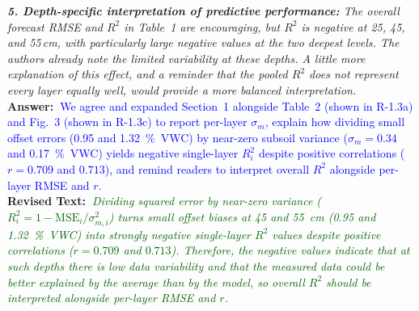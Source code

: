 \documentclass[10pt]{article}
\newcommand{\query}[2][]{\ifthenelse{\equal{#1}{}}{}{\textbf{#1:}~}\emph{#2}}
\newcommand{\ans}[1]{\textbf{Answer:~}#1}
\newcommand{\Rtext}[1]{\textbf{Revised Text:~}#1}
\begin{document}
\query[R-2.5]{\textbf{5. Depth-specific interpretation of predictive performance:} The overall forecast RMSE and $R^2$ in Table~1 are encouraging, but $R^2$ is negative at 25, 45, and 55\,cm, with particularly large negative values at the two deepest levels. The authors already note the limited variability at these depths. A little more explanation of this effect, and a reminder that the pooled $R^2$ does not represent every layer equally well, would provide a more balanced interpretation.}\\
\ans{\textcolor{blue}{We agree and expanded Section~1 alongside Table~2 (shown in R-1.3a) and Fig.~3 (shown in R-1.3c) to report per-layer $\sigma_m$, explain how dividing small offset errors (\SI{0.95}{} and \SI{1.32}{\%VWC}) by near-zero subsoil variance ($\sigma_m = 0.34$ and \SI{0.17}{\%VWC}) yields negative single-layer $R^2_i$ despite positive correlations ($r = 0.709$ and $0.713$), and remind readers to interpret overall $R^2$ alongside per-layer RMSE and $r$.}}\\
\Rtext{\emph{\textcolor{darkgreen}{Dividing squared error by near-zero variance ($R^2_i = 1 - \mathrm{MSE}_i/\sigma_{m,i}^2$) turns small offset biases at 45 and 55~\si{cm} (\SI{0.95}{} and \SI{1.32}{\%VWC}) into strongly negative single-layer $R^2$ values despite positive correlations ($r = 0.709$ and $0.713$). Therefore, the negative values indicate that at such depths there is low data variability and that the measured data could be better explained by the average than by the model, so overall $R^2$ should be interpreted alongside per-layer RMSE and $r$.}}}
\end{document}
